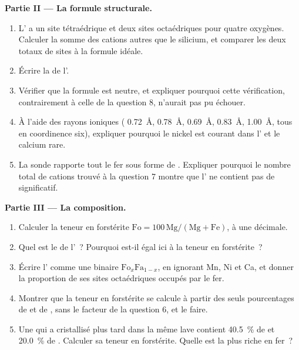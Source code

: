 \begin{problem}
\medskip
\noindent\textbf{Partie II --- La formule structurale.}
\begin{enumerate}[resume]
  \item L' a un site tétraédrique et deux sites octaédriques pour quatre
        oxygènes. Calculer la somme des cations autres que le silicium, et
        comparer les deux totaux de sites à la formule idéale.
  \item Écrire la  de l'.
  \item Vérifier que la formule est neutre, et expliquer pourquoi cette
        vérification, contrairement à celle de la question 8, n'aurait pas pu
        échouer.
  \item À l'aide des rayons ioniques ( \qty{0.72}{\angstrom},
         \qty{0.78}{\angstrom}, 
        \qty{0.69}{\angstrom},  \qty{0.83}{\angstrom},
         \qty{1.00}{\angstrom}, tous en coordinence six), expliquer
        pourquoi le nickel est courant dans l' et le calcium rare.
  \item La sonde rapporte tout le fer sous forme de . Expliquer pourquoi
        le nombre total de cations trouvé à la question 7 montre que l' ne
        contient pas de  significatif.
\end{enumerate}

\medskip
\noindent\textbf{Partie III --- La composition.}
\begin{enumerate}[resume]
  \item Calculer la teneur en forstérite $\mathrm{Fo} = 100\,\mathrm{Mg}/(\mathrm{Mg} +
        \mathrm{Fe})$, à une décimale.
  \item Quel est le  de l'~? Pourquoi est-il égal ici à
        la teneur en forstérite~?
  \item Écrire l' comme une  binaire
        $\mathrm{Fo}_x\mathrm{Fa}_{1-x}$, en ignorant Mn, Ni et Ca, et donner la
        proportion de ses sites octaédriques occupés par le fer.
  \item Montrer que la teneur en forstérite se calcule à partir des seuls
        pourcentages de  et de , sans le facteur de la
        question 6, et le faire.
  \item Une  qui a cristallisé plus tard dans la même lave contient
        \qty{40.5}{\percent} de  et \qty{20.0}{\percent} de .
        Calculer sa teneur en forstérite. Quelle  est la plus riche en
        fer~?
\end{enumerate}


\end{problem}
